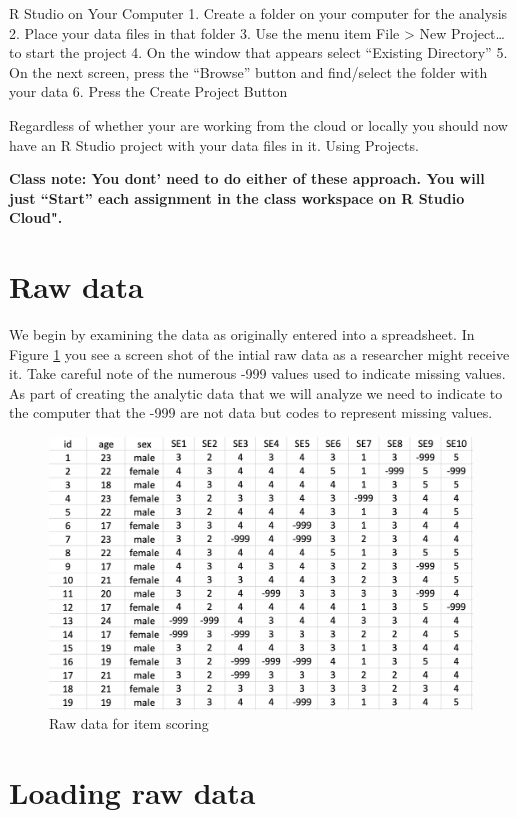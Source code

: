 \documentclass[
]{krantz}
\begin{document}
R Studio on Your Computer
1. Create a folder on your computer for the analysis
2. Place your data files in that folder
3. Use the menu item File \textgreater{} New Project\ldots{} to start the project
4. On the window that appears select ``Existing Directory''
5. On the next screen, press the ``Browse'' button and find/select the folder with your data
6. Press the Create Project Button

Regardless of whether your are working from the cloud or locally you should now have an R Studio project with your data files in it. Using Projects.

\textbf{Class note: You dont' need to do either of these approach. You will just ``Start'' each assignment in the class workspace on R Studio Cloud".}

\hypertarget{raw-data}{%
\section{Raw data}\label{raw-data}}

We begin by examining the data as originally entered into a spreadsheet. In Figure \ref{fig:rawdataitems} you see a screen shot of the intial raw data as a researcher might receive it. Take careful note of the numerous -999 values used to indicate missing values. As part of creating the analytic data that we will analyze we need to indicate to the computer that the -999 are not data but codes to represent missing values.

\begin{figure}
\includegraphics[width=0.85\linewidth]{ch_score_items/images/screenshot_raw_data} \caption{Raw data for item scoring}\label{fig:rawdataitems}
\end{figure}

\hypertarget{loading-raw-data}{%
\section{Loading raw data}\label{loading-raw-data}}
\end{document}
